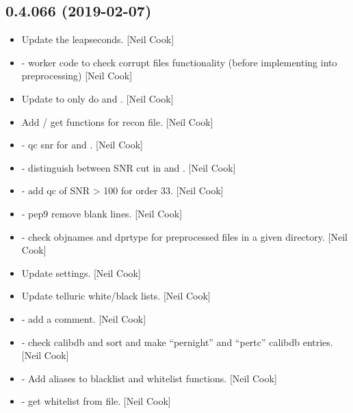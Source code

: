 \documentclass[a4paper,10pt,english]{report}
\begin{document}
\subsection{0.4.066 (2019-02-07)}
\label{\detokenize{misc/changelog:id192}}\begin{itemize}
\item {} 
Update the leapseconds. {[}Neil Cook{]}

\item {} 
 - worker code to check corrupt files
functionality (before implementing into preprocessing) {[}Neil Cook{]}

\item {} 
Update to only do  and . {[}Neil Cook{]}

\item {} 
Add  / get functions for recon file. {[}Neil Cook{]}

\item {} 
 - qc snr for  and . {[}Neil
Cook{]}

\item {} 
 - distinguish between SNR cut in  and
. {[}Neil Cook{]}

\item {} 
 - add qc of SNR \textgreater{} 100 for order 33. {[}Neil Cook{]}

\item {} 
 - pep9 remove blank lines. {[}Neil Cook{]}

\item {} 
 - check objnames and dprtype for preprocessed files
in a given directory. {[}Neil Cook{]}

\item {} 
Update  settings. {[}Neil Cook{]}

\item {} 
Update telluric white/black lists. {[}Neil Cook{]}

\item {} 
 - add a comment. {[}Neil Cook{]}

\item {} 
 - check calibdb and sort and make “pernight” and
“pertc” calibdb entries. {[}Neil Cook{]}

\item {} 
 - Add aliases to blacklist and whitelist
functions. {[}Neil Cook{]}

\item {} 
 - get whitelist from file. {[}Neil Cook{]}

\end{itemize}
\end{document}
